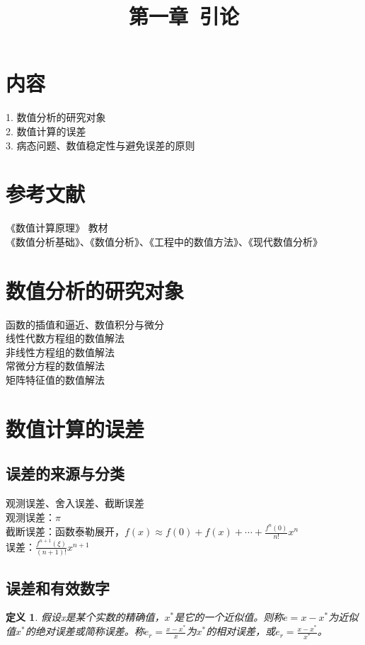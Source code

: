 \documentclass[a4paper]{article}
\title{第一章\ 引论}
\date{}
\newtheorem{definition}{定义}[section]
\begin{document}
\maketitle
\section{内容}
1. 数值分析的研究对象 \\
2. 数值计算的误差 \\
3. 病态问题、数值稳定性与避免误差的原则 \\

\section{参考文献}
《数值计算原理》  教材 \\
《数值分析基础》、《数值分析》、《工程中的数值方法》、《现代数值分析》

\section{数值分析的研究对象}
函数的插值和逼近、数值积分与微分 \\
线性代数方程组的数值解法 \\
非线性方程组的数值解法 \\
常微分方程的数值解法 \\
矩阵特征值的数值解法 \\

\section{数值计算的误差}
\subsection{误差的来源与分类}
观测误差、舍入误差、截断误差 \\
观测误差：$\pi$ \\
截断误差：函数泰勒展开，$f(x) \approx f(0) + f(x) + \cdots + \frac{f^n(0)}{n!}x^n$ \\
误差：$\frac{f^{n+1}(\xi)}{(n+1)!}x^{n+1}$

\subsection{误差和有效数字}
\begin{definition}
假设x是某个实数的精确值，$x^*$是它的一个近似值。则称$e=x-x^*$为近似值$x^*$的绝对误差或简称误差。称$e_r=\frac{x-x^*}{x}$为$x^*$的相对误差，或$e_r=\frac{x-x^*}{x^*}$。
\end{definition}
\end{document}
